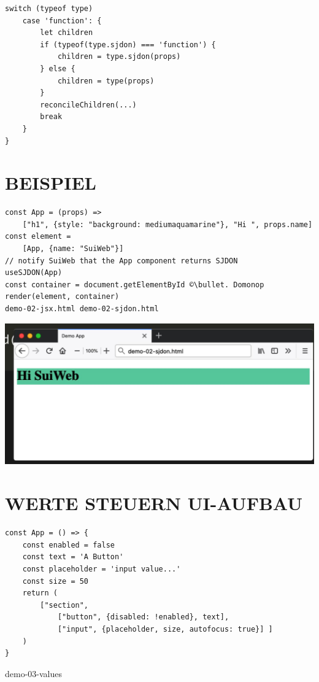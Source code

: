 \documentclass[10pt]{article}
\begin{document}
\begin{verbatim}
switch (typeof type)
    case 'function': {
        let children
        if (typeof(type.sjdon) === 'function') {
            children = type.sjdon(props)
        } else {
            children = type(props)
        }
        reconcileChildren(...)
        break
    }
}
\end{verbatim}

\section*{BEISPIEL}
\begin{verbatim}
const App = (props) =>
    ["h1", {style: "background: mediumaquamarine"}, "Hi ", props.name]
const element =
    [App, {name: "SuiWeb"}]
// notify SuiWeb that the App component returns SJDON
useSJDON(App)
const container = document.getElementById ©\bullet. Domonop
render(element, container)
demo-02-jsx.html demo-02-sjdon.html
\end{verbatim}

\begin{center}
\includegraphics[max width=\textwidth]{2025_01_02_254b5e4c52d090c313e1g-25}
\end{center}

\section*{WERTE STEUERN UI-AUFBAU}
\begin{verbatim}
const App = () => {
    const enabled = false
    const text = 'A Button'
    const placeholder = 'input value...'
    const size = 50
    return (
        ["section",
            ["button", {disabled: !enabled}, text],
            ["input", {placeholder, size, autofocus: true}] ]
    )
}
\end{verbatim}

demo-03-values
\end{document}
